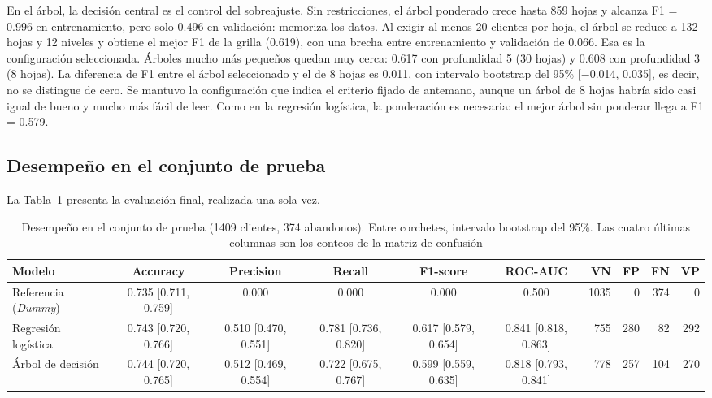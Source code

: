 En el árbol, la decisión central es el control del sobreajuste. Sin restricciones, el árbol
ponderado crece hasta 859 hojas y alcanza F1 = 0.996 en entrenamiento, pero solo 0.496 en
validación: memoriza los datos. Al exigir al menos 20 clientes por hoja, el árbol se reduce a 132
hojas y 12 niveles y obtiene el mejor F1 de la grilla (0.619), con una brecha entre entrenamiento y
validación de 0.066. Esa es la configuración seleccionada. Árboles mucho más pequeños quedan muy
cerca: 0.617 con profundidad 5 (30 hojas) y 0.608 con profundidad 3 (8 hojas). La diferencia de F1
entre el árbol seleccionado y el de 8 hojas es 0.011, con intervalo bootstrap del 95\%
[$-$0.014, 0.035], es decir, no se distingue de cero. Se mantuvo la configuración que indica el
criterio fijado de antemano, aunque un árbol de 8 hojas habría sido casi igual de bueno y mucho más
fácil de leer. Como en la regresión logística, la ponderación es necesaria: el mejor árbol sin
ponderar llega a F1 = 0.579.

\subsection{Desempeño en el conjunto de prueba}
La Tabla~\ref{tab:test} presenta la evaluación final, realizada una sola vez.

\begin{table}[t]
    \caption{Desempeño en el conjunto de prueba (1409 clientes, 374 abandonos). Entre corchetes,
    intervalo bootstrap del 95\%. Las cuatro últimas columnas son los conteos de la matriz de confusión}
    \label{tab:test}
    \centering\footnotesize
    \setlength{\tabcolsep}{3pt}
    \begin{tabular}{@{}lcccccrrrr@{}}
        \toprule
        Modelo & Accuracy & Precision & Recall & F1-score & ROC-AUC & VN & FP & FN & VP \\
        \midrule
        Referencia (\emph{Dummy}) & 0.735 [0.711, 0.759] & 0.000 & 0.000 & 0.000 & 0.500 & 1035 & 0 & 374 & 0 \\
        Regresión logística & 0.743 [0.720, 0.766] & 0.510 [0.470, 0.551] & 0.781 [0.736, 0.820]
        & 0.617 [0.579, 0.654] & 0.841 [0.818, 0.863] & 755 & 280 & 82 & 292 \\
        Árbol de decisión & 0.744 [0.720, 0.765] & 0.512 [0.469, 0.554] & 0.722 [0.675, 0.767]
        & 0.599 [0.559, 0.635] & 0.818 [0.793, 0.841] & 778 & 257 & 104 & 270 \\
        \bottomrule
    \end{tabular}
\end{table}

